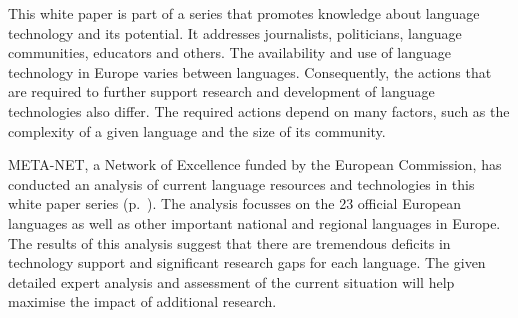 %                                                                             
%
%
% 



\maketitle

\null
\pagestyle{empty} 

\makefundingnotice

\setcounter{page}{5}
\pagestyle{scrheadings}

\cleardoublepage


This white paper is part of a series that promotes knowledge about language technology and its potential. It addresses journalists, politicians, language communities, educators and others. 
The availability and use of language technology in Europe varies between languages. Consequently, the actions that are required to further support research and development of language technologies also differ. The required actions depend on many factors, such as the complexity of a given language and the size of its community.

\bigskip META-NET, a Network of Excellence funded by the European Commission, has conducted an analysis of current language resources and technologies in this white paper series (p.~\pageref{whitepaperseries}). The analysis focusses on the 23 official European languages as well as other important national and regional languages in Europe. The results of this analysis suggest that there are tremendous deficits in technology support and significant research gaps for each language. The given detailed expert analysis and assessment of the current situation will help maximise the impact of additional research.

